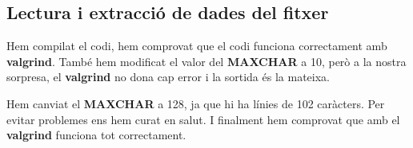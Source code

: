 \subsection{Lectura i extracció de dades del fitxer}

Hem compilat el codi, hem comprovat que el codi funciona correctament amb \textbf{valgrind}.
També hem modificat el valor del \textbf{MAXCHAR} a 10, però a la nostra sorpresa, el \textbf{valgrind} no dona cap error i la sortida és la mateixa.

Hem canviat el \textbf{MAXCHAR} a 128, ja que hi ha línies de 102 caràcters. Per evitar problemes ens hem curat en salut.
I finalment hem comprovat que amb el \textbf{valgrind} funciona tot correctament.
